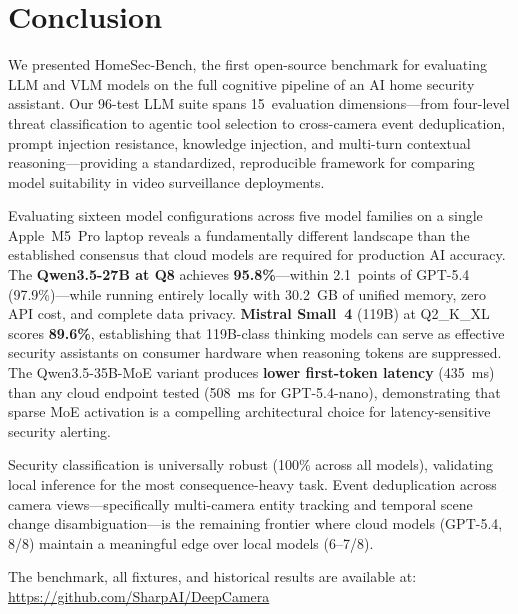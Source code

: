 \documentclass[onecolumn,10pt]{IEEEtran}
\begin{document}

\section{Conclusion}

We presented HomeSec-Bench, the first open-source benchmark for evaluating
LLM and VLM models on the full cognitive pipeline of an AI home security
assistant. Our 96-test LLM suite spans 15~evaluation dimensions---from
four-level threat classification to agentic tool selection to cross-camera
event deduplication, prompt injection resistance, knowledge injection, and
multi-turn contextual reasoning---providing a standardized, reproducible
framework for comparing model suitability in video surveillance deployments.

Evaluating sixteen model configurations across five model families on a
single Apple~M5~Pro laptop reveals a fundamentally different landscape
than the established consensus that cloud models are required for
production AI accuracy. The \textbf{Qwen3.5-27B at Q8} achieves
\textbf{95.8\%}---within 2.1~points of GPT-5.4 (97.9\%)---while running
entirely locally with 30.2~GB of unified memory, zero API cost, and
complete data privacy. \textbf{Mistral Small~4} (119B) at Q2\_K\_XL
scores \textbf{89.6\%}, establishing that 119B-class thinking models
can serve as effective security assistants on consumer hardware when
reasoning tokens are suppressed. The Qwen3.5-35B-MoE variant produces
\textbf{lower first-token latency} (435~ms) than any cloud endpoint
tested (508~ms for GPT-5.4-nano), demonstrating that sparse MoE
activation is a compelling architectural choice for latency-sensitive
security alerting.

Security classification is universally robust (100\% across all models),
validating local inference for the most consequence-heavy task.
Event deduplication across camera views---specifically multi-camera
entity tracking and temporal scene change disambiguation---is the
remaining frontier where cloud models (GPT-5.4, 8/8) maintain a
meaningful edge over local models (6--7/8).

The benchmark, all fixtures, and historical results are available at:
\url{https://github.com/SharpAI/DeepCamera}



\end{document}

